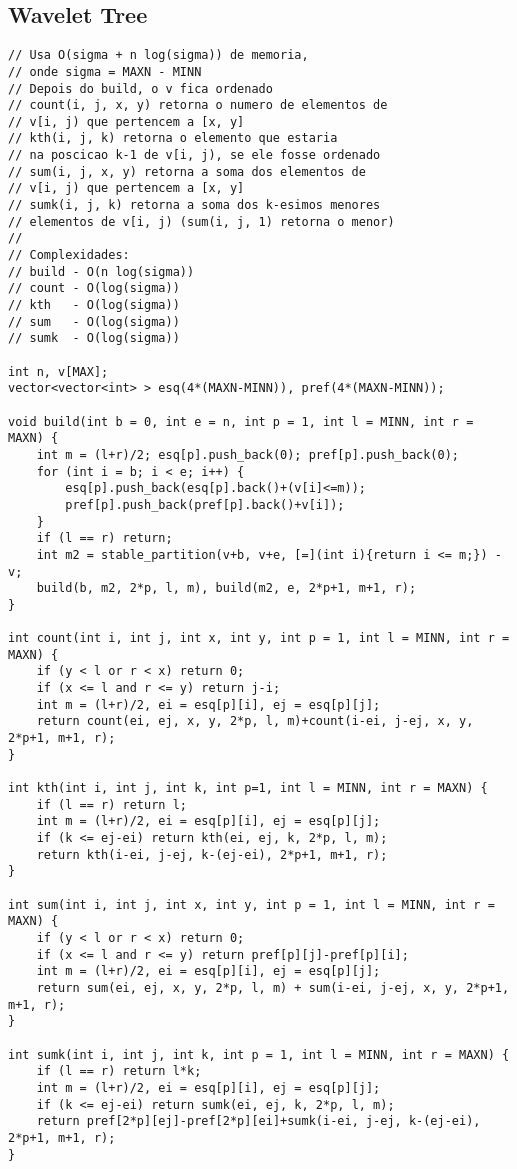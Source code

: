 \documentclass[12pt, a4paper, twoside]{article}
\begin{document}
\subsection{Wavelet Tree}
\begin{lstlisting}
// Usa O(sigma + n log(sigma)) de memoria,
// onde sigma = MAXN - MINN
// Depois do build, o v fica ordenado
// count(i, j, x, y) retorna o numero de elementos de
// v[i, j) que pertencem a [x, y]
// kth(i, j, k) retorna o elemento que estaria
// na poscicao k-1 de v[i, j), se ele fosse ordenado
// sum(i, j, x, y) retorna a soma dos elementos de
// v[i, j) que pertencem a [x, y]
// sumk(i, j, k) retorna a soma dos k-esimos menores
// elementos de v[i, j) (sum(i, j, 1) retorna o menor)
//
// Complexidades:
// build - O(n log(sigma))
// count - O(log(sigma))
// kth   - O(log(sigma))
// sum   - O(log(sigma))
// sumk  - O(log(sigma))

int n, v[MAX];
vector<vector<int> > esq(4*(MAXN-MINN)), pref(4*(MAXN-MINN));

void build(int b = 0, int e = n, int p = 1, int l = MINN, int r = MAXN) {
	int m = (l+r)/2; esq[p].push_back(0); pref[p].push_back(0);
	for (int i = b; i < e; i++) {
		esq[p].push_back(esq[p].back()+(v[i]<=m));
		pref[p].push_back(pref[p].back()+v[i]);
	}
	if (l == r) return;
	int m2 = stable_partition(v+b, v+e, [=](int i){return i <= m;}) - v;
	build(b, m2, 2*p, l, m), build(m2, e, 2*p+1, m+1, r);
}

int count(int i, int j, int x, int y, int p = 1, int l = MINN, int r = MAXN) {
	if (y < l or r < x) return 0;
	if (x <= l and r <= y) return j-i;
	int m = (l+r)/2, ei = esq[p][i], ej = esq[p][j];
	return count(ei, ej, x, y, 2*p, l, m)+count(i-ei, j-ej, x, y, 2*p+1, m+1, r);
}

int kth(int i, int j, int k, int p=1, int l = MINN, int r = MAXN) {
	if (l == r) return l;
	int m = (l+r)/2, ei = esq[p][i], ej = esq[p][j];
	if (k <= ej-ei) return kth(ei, ej, k, 2*p, l, m);
	return kth(i-ei, j-ej, k-(ej-ei), 2*p+1, m+1, r);
}

int sum(int i, int j, int x, int y, int p = 1, int l = MINN, int r = MAXN) {
	if (y < l or r < x) return 0;
	if (x <= l and r <= y) return pref[p][j]-pref[p][i];
	int m = (l+r)/2, ei = esq[p][i], ej = esq[p][j];
	return sum(ei, ej, x, y, 2*p, l, m) + sum(i-ei, j-ej, x, y, 2*p+1, m+1, r);
}

int sumk(int i, int j, int k, int p = 1, int l = MINN, int r = MAXN) {
	if (l == r) return l*k;
	int m = (l+r)/2, ei = esq[p][i], ej = esq[p][j];
	if (k <= ej-ei) return sumk(ei, ej, k, 2*p, l, m);
	return pref[2*p][ej]-pref[2*p][ei]+sumk(i-ei, j-ej, k-(ej-ei), 2*p+1, m+1, r);
}
\end{lstlisting}
\end{document}
